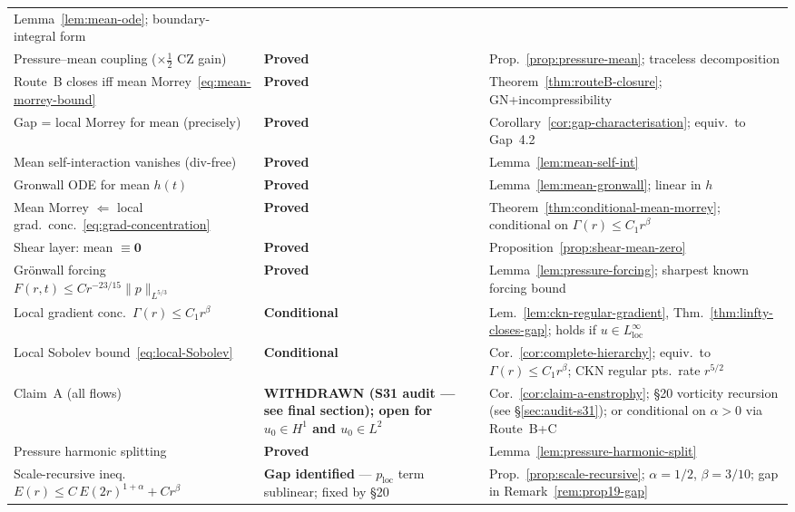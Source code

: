 \documentclass[11pt]{article}
\theoremstyle{definition}
\theoremstyle{remark}
\begin{document}
\begin{center}
\begin{tabular}{@{}lll@{}}
  Lemma~\ref{lem:mean-ode}; boundary-integral form \\
Pressure--mean coupling ($\times\tfrac{1}{2}$ CZ gain) & \textbf{Proved} &
  Prop.~\ref{prop:pressure-mean}; traceless decomposition \\
Route~B closes iff mean Morrey~\eqref{eq:mean-morrey-bound} & \textbf{Proved} &
  Theorem~\ref{thm:routeB-closure}; GN+incompressibility \\
Gap = local Morrey for mean (precisely) & \textbf{Proved} &
  Corollary~\ref{cor:gap-characterisation}; equiv.\ to Gap~4.2 \\
Mean self-interaction vanishes (div-free) & \textbf{Proved} &
  Lemma~\ref{lem:mean-self-int} \\
Gronwall ODE for mean $h(t)$ & \textbf{Proved} &
  Lemma~\ref{lem:mean-gronwall}; linear in $h$ \\
Mean Morrey $\Leftarrow$ local grad.\ conc.~\eqref{eq:grad-concentration} & \textbf{Proved} &
  Theorem~\ref{thm:conditional-mean-morrey}; conditional on $\Gamma(r)\leq C_1 r^\beta$ \\
Shear layer: mean $\equiv\mathbf{0}$ & \textbf{Proved} &
  Proposition~\ref{prop:shear-mean-zero} \\
Gr\"{o}nwall forcing $F(r,t)\leq Cr^{-23/15}\|p\|_{L^{5/3}}$ & \textbf{Proved} &
  Lemma~\ref{lem:pressure-forcing}; sharpest known forcing bound \\
Local gradient conc.~$\Gamma(r)\leq C_1 r^\beta$ & \textbf{Conditional} &
  Lem.~\ref{lem:ckn-regular-gradient}, Thm.~\ref{thm:linfty-closes-gap}; holds if $u\in L^\infty_{\mathrm{loc}}$ \\
Local Sobolev bound~\eqref{eq:local-Sobolev} & \textbf{Conditional} &
  Cor.~\ref{cor:complete-hierarchy}; equiv.\ to $\Gamma(r)\leq C_1 r^\beta$; CKN regular pts.\ rate $r^{5/2}$ \\
Claim~A (all flows) & \textbf{WITHDRAWN (S31 audit --- see final section); open for $u_0\in H^1$ and $u_0\in L^2$} &
  Cor.~\ref{cor:claim-a-enstrophy}; §20 vorticity recursion (see \S\ref{sec:audit-s31}); or conditional on $\alpha>0$ via Route~B+C \\
Pressure harmonic splitting & \textbf{Proved} &
  Lemma~\ref{lem:pressure-harmonic-split} \\
Scale-recursive ineq.\ $E(r)\leq C\,E(2r)^{1+\alpha}+Cr^\beta$ &
  \textbf{Gap identified} --- $p_{\mathrm{loc}}$ term sublinear; fixed by §20 &
  Prop.~\ref{prop:scale-recursive}; $\alpha=1/2$, $\beta=3/10$; gap in Remark~\ref{rem:prop19-gap} \\

\end{tabular}
\end{center}
\end{document}
